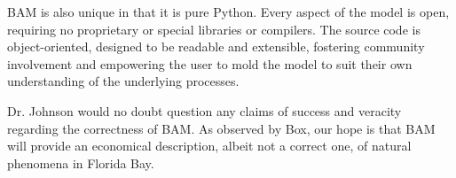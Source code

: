 BAM is also unique in that it is pure Python.  Every aspect of the model is open, requiring no proprietary or special libraries or compilers.  The source code is object-oriented, designed to be readable and extensible, fostering community involvement and empowering the user to mold the model to suit their own understanding of the underlying processes. 

Dr. Johnson would no doubt question any claims of success and veracity regarding the correctness of BAM.  As observed by Box, our hope is that BAM will provide an economical description, albeit not a correct one, of natural phenomena in Florida Bay.

\cleardoublepage

